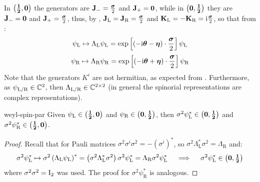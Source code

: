 In $ \mathbf{\left( \frac{1}{2},0 \right)} $ the generators are $ \mathbf{J}_- = \frac{\boldsymbol{\sigma}}{2} $ and $ \mathbf{J}_+ = \mathbf{0} $, while in $ \mathbf{\left( 0,\frac{1}{2} \right)} $ they are $ \mathbf{J}_- = \mathbf{0} $ and $ \mathbf{J}_+ = \frac{\boldsymbol{\sigma}}{2} $, thus, by , $ \mathbf{J}_\text{L} = \mathbf{J}_\text{R} = \frac{\boldsymbol{\sigma}}{2} $ and $ \mathbf{K}_\text{L} = - \mathbf{K}_\text{R} = \mathrm{i} \frac{\boldsymbol{\sigma}}{2} $, so that from :
\begin{equation}
  \psi_\text{L} \mapsto \Lambda_\text{L} \psi_\text{L} = \exp \left[ \left( -\mathrm{i} \boldsymbol{\theta} - \boldsymbol{\eta} \right) \cdot \frac{\boldsymbol{\sigma}}{2} \right] \psi_\text{L}
  \label{eq:lor-left-hand-weyl}
\end{equation}
\begin{equation}
  \psi_\text{R} \mapsto \Lambda_\text{R} \psi_\text{R} = \exp \left[ \left( -\mathrm{i} \boldsymbol{\theta} + \boldsymbol{\eta} \right) \cdot \frac{\boldsymbol{\sigma}}{2} \right] \psi_\text{R}
  \label{eq:lor-right-hand-weyl}
\end{equation}
Note that the generators $ K^i $ are not hermitian, as expected from . Furthermore, as $ \psi_{\text{L}/\text{R}} \in \mathbb{C}^2 $, then $ \Lambda_{\text{L}/\text{R}} \in \mathbb{C}^{2 \times 2} $ (in general the spinorial representations are complex representations).

\begin{proposition}{}{weyl-spin-par}
  Given $ \psi_\text{L} \in \mathbf{\left( \frac{1}{2},0 \right)} $ and $ \psi_\text{R} \in \mathbf{\left( 0,\frac{1}{2} \right)} $, then $ \sigma^2 \psi_\text{L}^* \in \mathbf{\left( 0,\frac{1}{2} \right)} $ and $ \sigma^2 \psi_\text{R}^* \in \mathbf{\left( \frac{1}{2},0 \right)} $.
\end{proposition}

\begin{proofbox}
  \begin{proof}
    Recall that for Pauli matrices $ \sigma^2 \sigma^i \sigma^2 = -(\sigma^i)^* $, so $ \sigma^2 \Lambda_\text{L}^* \sigma^2 = \Lambda_\text{R} $ and:
    \begin{equation*}
      \sigma^2 \psi_\text{L}^* \mapsto \sigma^2 \left( \Lambda_\text{L} \psi_\text{L} \right)^* = \left( \sigma^2 \Lambda_\text{L}^* \sigma^2 \right) \sigma^2 \psi_\text{L}^* = \Lambda_\text{R} \sigma^2 \psi_\text{L}^*
      \quad \implies \quad
      \sigma^2 \psi_\text{L}^* \in \mathbf{\left( 0,\tfrac{1}{2} \right)}
    \end{equation*}
    where $ \sigma^2 \sigma^2 = \mathrm{I}_2 $ was used. The proof for $ \sigma^2 \psi_\text{R}^* $ is analogous.
  \end{proof}
\end{proofbox}

